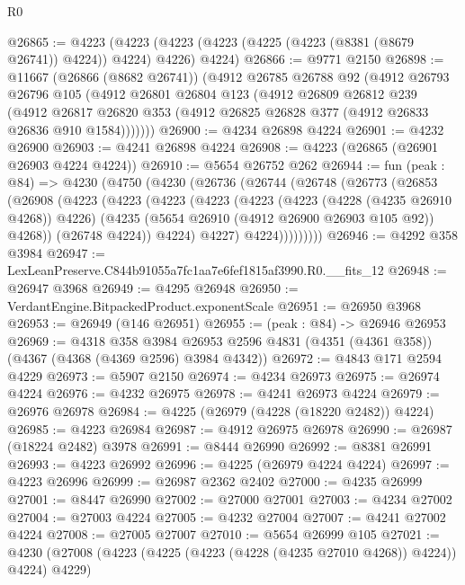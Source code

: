 \begin{lexlean}{R0}
\begin{coremodule}
@26865 := @4223
    (@4223 (@4223 (@4223 (@4225 (@4223 (@8381 (@8679 @26741)) @4224)) @4224) @4226) @4224)
@26866 := @9771 @2150
@26898 := @11667
    (@26866 (@8682 @26741))
    (@4912
      @26785
      @26788
      @92
      (@4912
        @26793
        @26796
        @105
        (@4912
          @26801
          @26804
          @123
          (@4912
            @26809
            @26812
            @239
            (@4912
              @26817
              @26820
              @353
              (@4912 @26825 @26828 @377 (@4912 @26833 @26836 @910 @1584)))))))
@26900 := @4234 @26898 @4224
@26901 := @4232 @26900
@26903 := @4241 @26898 @4224
@26908 := @4223 (@26865 (@26901 @26903 @4224 @4224))
@26910 := @5654 @26752 @262
@26944 := fun (peak : @84) =>
  @4230
    (@4750
      (@4230
        (@26736
          (@26744
            (@26748
              (@26773
                (@26853
                  (@26908
                    (@4223
                      (@4223
                        (@4223
                          (@4223
                            (@4223
                              (@4223 (@4228 (@4235 @26910 @4268)) @4226)
                              (@4235 (@5654 @26910 (@4912 @26900 @26903 @105 @92)) @4268))
                            (@26748 @4224))
                          @4224)
                        @4227)
                      @4224)))))))))
@26946 := @4292 @358 @3984
@26947 := LexLeanPreserve.C844b91055a7fc1aa7e6fef1815af3990.R0.__fits_12
@26948 := @26947 @3968
@26949 := @4295 @26948
@26950 := VerdantEngine.BitpackedProduct.exponentScale
@26951 := @26950 @3968
@26953 := @26949 (@146 @26951)
@26955 := (peak : @84) -> @26946 @26953
@26969 := @4318
    @358
    @3984
    @26953
    @2596
    @4831
    (@4351 (@4361 @358))
    (@4367 (@4368 (@4369 @2596) @3984 @4342))
@26972 := @4843 @171 @2594 @4229
@26973 := @5907 @2150
@26974 := @4234 @26973
@26975 := @26974 @4224
@26976 := @4232 @26975
@26978 := @4241 @26973 @4224
@26979 := @26976 @26978
@26984 := @4225 (@26979 (@4228 (@18220 @2482)) @4224)
@26985 := @4223 @26984
@26987 := @4912 @26975 @26978
@26990 := @26987 (@18224 @2482) @3978
@26991 := @8444 @26990
@26992 := @8381 @26991
@26993 := @4223 @26992
@26996 := @4225 (@26979 @4224 @4224)
@26997 := @4223 @26996
@26999 := @26987 @2362 @2402
@27000 := @4235 @26999
@27001 := @8447 @26990
@27002 := @27000 @27001
@27003 := @4234 @27002
@27004 := @27003 @4224
@27005 := @4232 @27004
@27007 := @4241 @27002 @4224
@27008 := @27005 @27007
@27010 := @5654 @26999 @105
@27021 := @4230 (@27008 (@4223 (@4225 (@4223 (@4228 (@4235 @27010 @4268)) @4224)) @4224) @4229)

\end{coremodule}
\end{lexlean}
